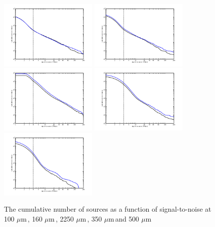 \documentclass[useAMS,usenatbib]{mn2e}
\def\mic{ $\mu $m\,}
\begin{document}
\begin{figure}
\includegraphics[width=0.42\textwidth,clip,trim={0 9mm 0mm 16mm}]{cum_sn_100.pdf}
\includegraphics[width=0.42\textwidth,clip,trim={0 9mm 0mm 16mm}]{cum_sn_160.pdf}
\includegraphics[width=0.42\textwidth,clip,trim={0 9mm 0mm 16mm}]{cum_sn_250.pdf}
\includegraphics[width=0.42\textwidth,clip,trim={0 9mm 0mm 16mm}]{cum_sn_350.pdf}
\includegraphics[width=0.42\textwidth,clip,trim={0 9mm 0mm 16mm}]{cum_sn_500.pdf}
 \caption{\protect\label{fig_sn} The cumulative number of sources as a function
   of signal-to-noise at  100\mic, 160\mic, 2250\mic, 350\mic and 500\mic}
\end{figure}
\end{document}

